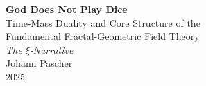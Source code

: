 \documentclass[11pt,openright,twoside]{book}
\begin{document}
\pagestyle{fancy}
\makeatletter
\let\ps@plain\ps@fancy
\let\ps@empty\ps@fancy
\makeatother

\begin{titlepage}
	\centering
	\vspace*{2cm}
	
	{\Huge\bfseries God Does Not Play Dice}\\[0.8cm]
	{\LARGE Time-Mass Duality and Core Structure of the}\\[0.3cm]
	{\LARGE Fundamental Fractal-Geometric Field Theory}\\[1.5cm]
	
	{\Large\itshape The $\xi$-Narrative}\\[2cm]
	
	{\large Johann Pascher}\\[1cm]
	
	{\large 2025}
	
	\vfill
\end{titlepage}

\frontmatter
\pagestyle{fancy}
\tableofcontents

\mainmatter
\pagestyle{fancy}




\end{document}
